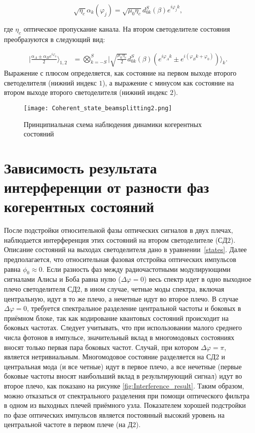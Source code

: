 \begin{equation}
\sqrt{\eta_c}\alpha_k(\varphi_j)=\sqrt{\mu_0\eta_c}d^S_{0k}(\beta)e^{i\varphi_jk},
\end{equation}


где $\eta_c$ оптическое пропускание канала. На втором светоделителе состояния преобразуются в следующий вид: 

\begin{align}\label{states}
\Big|\frac{\alpha_A \pm \alpha_Be^{i\varphi_0}}{2}\Big\rangle_{1,2} &= \bigotimes_{k=-S}^{S}\Big|\sqrt{\frac{\mu_0\eta_c}{2}}d_{0k}^{S}(\beta)\left(e^{i\varphi_Ak}\pm e^{i(\varphi_Bk+\varphi_0)}\right)\Big\rangle_k.
\end{align}
Выражение с плюсом определяется, как состояние на первом выходе второго светоделителя (нижний индекс $1$), а выражение с минусом как состояние на втором выходе второго светоделителя (нижний индекс  $2$). 
 
\begin{figure}[ht]
 \centering
  \texttt{[image: Coherent\_state\_beamsplitting2.png]}
  \caption{Принципиальная схема наблюдения динамики когерентных состояний}
  \label{fig:Coherent_states_beamsplitting2}
\end{figure}

\pagebreak

\section{Зависимость результата интерференции от разности фаз когерентных состояний} \label{ch:ch4/sec5}

После подстройки относительной фазы оптических сигналов в двух плечах, наблюдается интерференция этих состояний на втором светоделителе ($СД2$). Описание состояний на выходах светоделителя дано в уравнении~\ref{states}. Далее предполагается, что относительная фазовая отстройка оптических импульсов равна $\phi_0\approx0$. Если разность фаз между радиочастотными модулирующими сигналами Алисы и Боба равна нулю ($\Delta\varphi=0$) весь спектр идет в одно выходное плечо светоделителя $СД2$, в ином случае, четные моды спектра, включая центральную, идут в то же плечо, а нечетные идут во второе плечо. В случае $\Delta\varphi=0$, требуется спектральное разделение центральной частоты и боковых в приёмном блоке, так как кодирование квантовых состояний происходит на боковых частотах. Следует учитывать, что при использовании малого среднего числа фотонов в импульсе, значительный вклад в многомодовых состояниях вносят только первая пара боковых частот. Случай, при котором $\Delta\varphi=\pi$, является нетривиальным. Многомодовое состояние разделяется на $СД2$ и центральная мода (и все четные) идут в первое плечо, а все нечетные (первые боковые частоты вносят наибольший вклад в результирующий сигнал) идут во второе плечо, как показано на рисунке \ref{fig:Interference_result}. Таким образом, можно отказаться от спектрального разделения при помощи оптического фильтра в одном из выходных плечей приёмного узла. Показателем хорошей подстройки по фазе оптических импульсов является постоянный высокий уровень на центральной частоте в первом плече (на $Д2$).  


